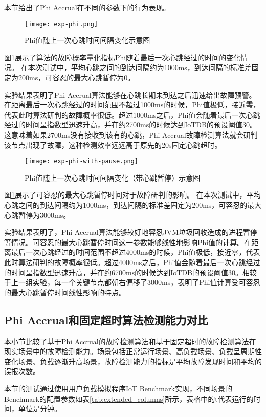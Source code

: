 本节给出了Phi Accrual在不同的参数下的行为表现。

\begin{figure}
    \centering
    \texttt{[image: exp-phi.png]}
    \caption{Phi值随上一次心跳时间间隔变化示意图}
    \label{fig:exp-phi}
\end{figure}

图\ref{fig:exp-phi}展示了算法的故障概率量化指标Phi随着最后一次心跳经过的时间的变化情况。
在本次测试中，平均心跳之间的到达间隔约为1000ms，到达间隔的标准差固定为200ms，可容忍的最大心跳暂停为0。

实验结果表明了Phi Accrual算法能够在心跳长期未到达之后迅速给出故障预警。在距离最后一次心跳经过的时间范围不超过1000ms的时候，Phi值极低，接近零，代表此时算法研判的故障概率很低。超过1000ms之后，Phi值会随着最后一次心跳经过的时间呈指数型迅速升高，并在约2700ms的时候达到IoTDB的预设阈值30。这意味着如果2700ms没有接收到该有的心跳，Phi Accrual故障检测算法就会研判该节点出现了故障，这种检测效率远远高于原先的20s固定心跳超时。


\begin{figure}
    \centering
    \texttt{[image: exp-phi-with-pause.png]}
    \caption{Phi值随上一次心跳时间间隔变化（带心跳暂停）示意图}
    \label{fig:exp-phi-with-pause}
\end{figure}

图\ref{fig:exp-phi}展示了可容忍的最大心跳暂停时间对于故障研判的影响。
在本次测试中，平均心跳之间的到达间隔约为1000ms，到达间隔的标准差固定为200ms，可容忍的最大心跳暂停为3000ms。

实验结果表明了，Phi Accrual算法能够较好地容忍JVM垃圾回收造成的进程暂停等情况。可容忍的最大心跳暂停时间这一参数能够线性地影响Phi值的计算。在距离最后一次心跳经过的时间范围不超过4000ms的时候，Phi值极低，接近零，代表此时算法研判的故障概率很低。超过4000ms之后，Phi值会随着最后一次心跳经过的时间呈指数型迅速升高，并在约6700ms的时候达到IoTDB的预设阈值30。相较于上一组实验，每一个关键节点都朝右偏移了3000ms，表明了Phi值计算受可容忍的最大心跳暂停时间线性影响的特点。


\subsection{Phi Accrual和固定超时算法检测能力对比}
本小节比较了基于Phi Accrual的故障检测算法和基于固定超时的故障检测算法在现实场景中的故障检测能力。场景包括正常运行场景、高负载场景、负载呈周期性变化场景、负载逐渐升高场景，故障检测能力的指标是平均故障发现时间和平均的误报次数。

本节的测试通过使用用户负载模拟程序IoT Benchmark实现，不同场景的Benchmark的配置参数如表\ref{tab:extended_columns}所示，表格中的t代表运行的时间，单位是分钟。

